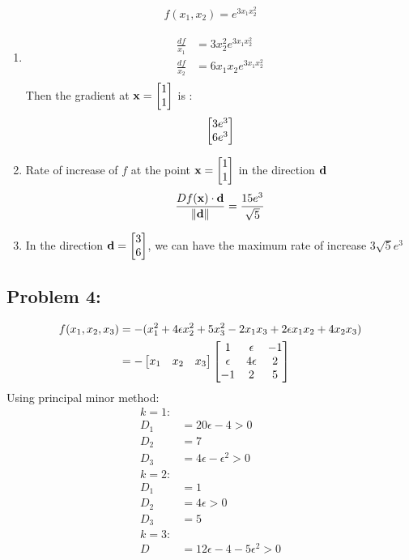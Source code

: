 \documentclass{article}
\begin{document}
\begin{align*} 
f(x_1, x_2) = e^{3x_1x_2^2} 
\end{align*} 
\begin{enumerate} 
\item 
\begin{align*} 
\frac{df}{x_1} &= 3x_2^2e^{3x_1x_2^2}\\
\frac{df}{x_2} &= 6x_1x_2e^{3x_1x_2^2}\\ 
\end{align*} 
Then the gradient at $\boldsymbol{\mathrm{x}} = \begin{bmatrix} 1 \\ 1 \end{bmatrix} $ is : \\
\begin{align*}
\begin{bmatrix} 3e^3 \\ 6 e^3  \end{bmatrix} 
\end{align*} 

\item 
Rate of increase of $f$ at the point $\boldsymbol{\mathrm{x}}=\begin{bmatrix} 1\\1 \end{bmatrix} $  in the direction $\boldsymbol{\mathrm{d}}$ 
\begin{align*} 
\frac{Df(\boldsymbol{\mathrm{x}})\cdot \boldsymbol{\mathrm{d}}}{\| \boldsymbol{\mathrm{d}} \|} = \frac{15e^3}{\sqrt{5}} 
\end{align*} 

\item 
In the direction $\boldsymbol{\mathrm{d}} = \begin{bmatrix} 3 \\ 6  \end{bmatrix}$, we can have the maximum rate of increase $3\sqrt{5} e^3$ 


\end{enumerate} 


\subsection*{Problem 4: } 
\begin{align*} 
f(x_1, x_2, x_3) &  =  -( x_1^2 + 4\epsilon x_2^2 + 5 x_3^2 -2x_1x_3 + 2\epsilon x_1x_2 + 4 x_2 x_3 )   \\
& =- \begin{bmatrix} x_1 & x_2 & x_3  \end{bmatrix} \begin{bmatrix} 1 & \epsilon & -1 \\ \epsilon & 4\epsilon & 2 \\ -1 & 2 & 5 \end{bmatrix} \\
\end{align*}
Using principal minor method: \\ 
\begin{align*} 
k= 1: \\
D_1 &= 20\epsilon - 4 > 0 \\
D_2 &= 7 \\
D_3 &= 4\epsilon - \epsilon^2 >0 \\
k=2 : \\
D_1 &= 1 \\
D_2 &= 4\epsilon>0  \\
D_3 &= 5 \\
k= 3 : \\
D &= 12\epsilon - 4 -5 \epsilon^2 > 0 \\
\end{align*} 
\end{document}
